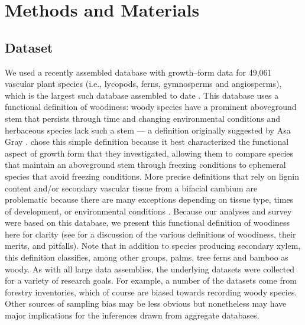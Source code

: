 \documentclass[a4paper,12pt]{article}
\begin{document}
\section{Methods and Materials}

\subsection{Dataset}

We used a recently assembled database with growth--form data for
49,061 vascular plant species (i.e., lycopods, ferns, gymnosperms and
angiosperms), which is the largest such database assembled to date
\citep[][available on the Dryad data repository; doi:10.5061/dryad.63q27/2]{Zanne}.
%
This database uses a functional definition of woodiness: woody species
have a prominent aboveground stem that persists through time and changing
environmental conditions and herbaceous species lack such a stem --- 
a definition originally suggested by Asa Gray \citeyearpar{gray1887elements}. 
\citet{Zanne}
chose this simple definition because it best characterized the functional
aspect of growth form that they investigated, allowing them to compare 
species that maintain an aboveground stem through freezing conditions to 
ephemeral species that avoid freezing conditions.  More precise definitions 
that rely on lignin content and/or secondary vascular tissue from a bifacial
cambium are problematic because there are many exceptions depending on tissue 
type, times of development, or environmental conditions 
\citep{Groover2005, Spicer2010, Rowe2012}.  
Because our analyses and survey were based on this database, 
we present this functional definition of woodiness here for clarity 
(see \citet{Zanne} for a discussion of the various definitions of woodiness, 
their merits, and pitfalls).  Note that in addition to species producing
secondary xylem, this definition
classifies, among other groups, palms, tree ferns and bamboo as
woody.
%
%
As with all large data assemblies, the underlying datasets were collected 
for a variety of research goals. For example, a number of the datasets come
from forestry inventories, which of course are biased towards recording
woody species. Other sources of sampling bias may be less obvious but
nonetheless may have major implications for the inferences drawn from 
aggregate databases.
\end{document}
